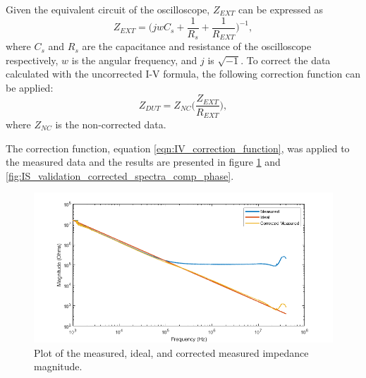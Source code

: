 \par Given the equivalent circuit of the oscilloscope, $Z_{EXT}$ can be expressed as
\begin{equation}
    Z_{EXT} = \bigg(jwC_{s}+\frac{1}{R_{s}}+\frac{1}{R_{EXT}}\bigg)^{-1},
    \label{eqn:corrected_Rext}
\end{equation}
\noindent where $C_{s}$ and $R_{s}$ are the capacitance and resistance of the oscilloscope respectively, $w$ is the angular frequency, and $j$ is $\sqrt{-1}$. To correct the data calculated with the uncorrected I-V formula, the following correction function can be applied:
\begin{equation}
    Z_{DUT} = Z_{NC}\bigg(\frac{Z_{EXT}}{R_{EXT}}\bigg),
    \label{eqn:IV_correction_function}
\end{equation}
\noindent where $Z_{NC}$ is the non-corrected data. 

\par The correction function, equation \ref{eqn:IV_correction_function}, was applied to the measured data and the results are presented in figure \ref{fig:IS_validation_corrected_spectra_comp_mag} and \ref{fig:IS_validation_corrected_spectra_comp_phase}. 

\vspace{0.4 in}

\begin{figure}[H]
    \centering
    \includegraphics[width=\textwidth]{images/CorrectedImpedanceMag.png}
    \caption{Plot of the measured, ideal, and corrected measured impedance magnitude.}
    \label{fig:IS_validation_corrected_spectra_comp_mag}
\end{figure}

